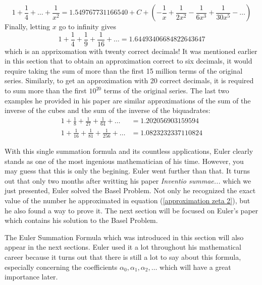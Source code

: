 $$1 + \frac{1}{4} + \dots + \frac{1}{x^2} = 1.549767731166540 + C + \left(-\frac{1}{x} + \frac{1}{2x^2} - \frac{1}{6x^3} + \frac{1}{30x^5} - \dots\right)$$
Finally, letting $x$ go to infinity gives
\begin{equation} \label{approximation zeta 2}
    \boxed{1 + \frac{1}{4} + \frac{1}{9} + \frac{1}{16} + \dots = 1.64493406684822643647}
\end{equation}
which is an apprixomation with twenty correct decimals! It was mentioned earlier in this section that to obtain an approximation correct to six decimals, it would require taking the sum of more than the first 15 million terms of the original series. Similarly, to get an approximation with 20 correct decimals, it is required to sum more than the first $10^{20}$ terms of the original series. The last two examples he provided in his paper are similar approximations of the sum of the inverse of the cubes and the sum of the inverse of the biquadrates:
\begin{align}
    1 + \frac{1}{8} + \frac{1}{27} + \frac{1}{64} + \dots &= 1.202056903159594 \\
    1 + \frac{1}{16} + \frac{1}{81} + \frac{1}{256} + \dots &= 1.0823232337110824
\end{align}

With this single summation formula and its countless applications, Euler clearly stands as one of the most ingenious mathematician of his time. However, you may guess that this is only the begining. Euler went further than that. It turns out that only two months after writting his paper \textit{Inventio summae...} which we just presented, Euler solved the Basel Problem. Not only he recognized the exact value of the number he approximated in equation (\ref{approximation zeta 2}), but he also found a way to prove it. The next section will be focused on Euler's paper which contains his solution to the Basel Problem. 

The Euler Summation Formula which was introduced in this section will also appear in the next sections. Euler used it a lot throughout his mathematical career because it turns out that there is still a lot to say about this formula, especially concerning the coefficients $\alpha_0, \alpha_1, \alpha_2, \dots$ which will have a great importance later. \\



